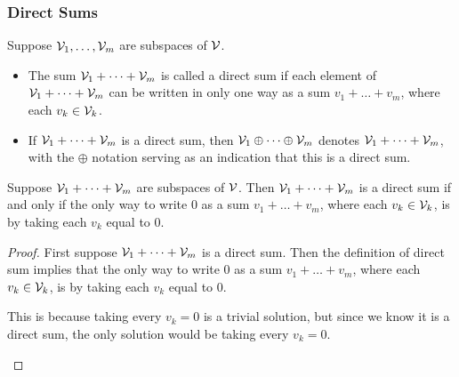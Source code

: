 \subsubsection{Direct Sums}
\begin{definition}
	Suppose $\mathcal{V}_1, \dots , \mathcal{V}_m$ are subspaces of $\mathcal{V}$.
\begin{itemize}
	\item The sum $\mathcal{V}_1 + \dots + \mathcal{V}_m$ is called a direct sum if each element of $\mathcal{V}_1 + \dots + \mathcal{V}_m$
	can be written in only one way as a sum $v_1 + \dots + v_m$, where each $v_k \in \mathcal{V}_k$.
	\item If $\mathcal{V}_1 + \dots + \mathcal{V}_m$ is a direct sum, then $\mathcal{V}_1 \oplus \dots \oplus \mathcal{V}_m$ denotes $\mathcal{V}_1 + \dots + \mathcal{V}_m$,
	with the $\oplus$ notation serving as an indication that this is a direct sum.
\end{itemize}	
\begin{theorem}
	Suppose $\mathcal{V}_1 + \dots + \mathcal{V}_m$ are subspaces of $\mathcal{V}$. Then $\mathcal{V}_1 + \dots + \mathcal{V}_m$ is a direct sum if
	and only if the only way to write 0 as a sum $v_1 + \dots + v_m$, where each $v_k \in \mathcal{V}_k$,
	is by taking each $v_k$ equal to 0.
\end{theorem}
\begin{proof}
	First suppose $\mathcal{V}_1 + \dots + \mathcal{V}_m$ is a direct sum. Then the definition of direct
	sum implies that the only way to write 0 as a sum $v_1 + \dots + v_m$, where each $v_k \in \mathcal{V}_k$,
	is by taking each $v_k$ equal to 0.
	
	\begin{tcolorbox}[colback=yellow!20, colframe=yellow!80!black, title=My thoughts]
		This is because taking every $v_k = 0$ is a trivial solution, but since we know it is a direct sum, the only solution would be taking every $v_k = 0$.
	\end{tcolorbox}
	

\end{proof}
\end{definition}
